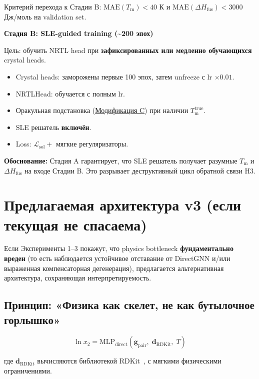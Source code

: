 \documentclass[11pt]{article}
\begin{document}
Критерий перехода к Стадии B: $\mathrm{MAE}(T_{\mathrm{m}}) < 40$ К и $\mathrm{MAE}(\Delta H_{\mathrm{fus}}) < 3000$ Дж/моль на validation set.

\textbf{Стадия B: SLE-guided training (\textasciitilde200 эпох)}

Цель: обучить NRTL head при \textbf{зафиксированных или медленно обучающихся} crystal heads.

\begin{itemize}
  \item Crystal heads: заморожены первые 100 эпох, затем unfreeze с lr $\times 0.01$.
  \item NRTLHead: обучается с полным lr.
  \item Оракульная подстановка (\hyperref[subsec:mod-c]{Модификация C}) при наличии $T_{\mathrm{m}}^{\mathrm{true}}$.
  \item SLE решатель \textbf{включён}.
  \item Loss: $\mathcal{L}_{\mathrm{sol}} + $ мягкие регуляризаторы.
\end{itemize}

\textbf{Обоснование:} Стадия A гарантирует, что SLE решатель получает разумные $T_{\mathrm{m}}$ и $\Delta H_{\mathrm{fus}}$ на входе Стадии B. Это разрывает деструктивный цикл обратной связи H3.

\section{Предлагаемая архитектура v3 (если текущая не спасаема)}

Если Эксперименты 1--3 покажут, что physics bottleneck \textbf{фундаментально вреден} (то есть наблюдается устойчивое отставание от DirectGNN и/или выраженная компенсаторная дегенерация), предлагается альтернативная архитектура, сохраняющая интерпретируемость.

\subsection{Принцип: «Физика как скелет, не как бутылочное горлышко»}

\begin{equation*}
\ln x_2 = \mathrm{MLP}_{\mathrm{direct}}(\mathbf{g}_{\mathrm{pair}},\; \mathbf{d}_{\mathrm{RDKit}},\; T)
\end{equation*}

где $\mathbf{d}_{\mathrm{RDKit}}$ вычисляются библиотекой RDKit~\cite{landrum2024}, с мягкими физическими ограничениями.
\end{document}
